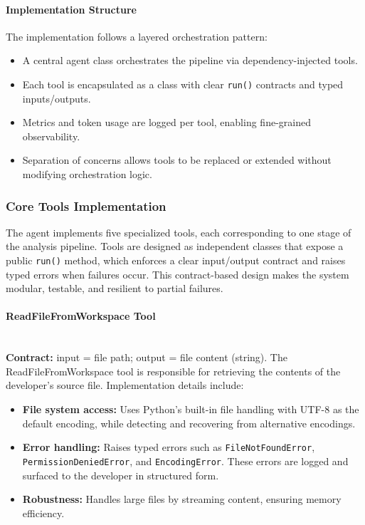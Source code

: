 \begin{spacing}{1.2}
\paragraph{Implementation Structure}
The implementation follows a layered orchestration pattern:
\begin{itemize}
    \item A central agent class orchestrates the pipeline via dependency-injected tools.
    \item Each tool is encapsulated as a class with clear \texttt{run()} contracts and typed inputs/outputs.
    \item Metrics and token usage are logged per tool, enabling fine-grained observability.
    \item Separation of concerns allows tools to be replaced or extended without modifying orchestration logic.
\end{itemize}

\subsubsection{Core Tools Implementation}
The agent implements five specialized tools, each corresponding to one stage of the analysis pipeline. Tools are designed as independent classes that expose a public \texttt{run()} method, which enforces a clear input/output contract and raises typed errors when failures occur. This contract-based design makes the system modular, testable, and resilient to partial failures.

\paragraph{ReadFileFromWorkspace Tool}\\
\textbf{Contract:} input = file path; output = file content (string).  
The ReadFileFromWorkspace tool is responsible for retrieving the contents of the developer’s source file. Implementation details include:
\begin{itemize}
    \item \textbf{File system access:} Uses Python’s built-in file handling with UTF-8 as the default encoding, while detecting and recovering from alternative encodings.
    \item \textbf{Error handling:} Raises typed errors such as \texttt{FileNotFoundError}, \texttt{PermissionDeniedError}, and \texttt{EncodingError}. These errors are logged and surfaced to the developer in structured form.
    \item \textbf{Robustness:} Handles large files by streaming content, ensuring memory efficiency.
\end{itemize}


\end{spacing}
